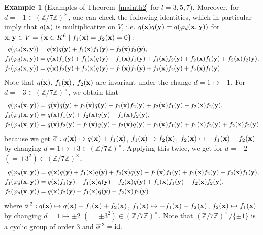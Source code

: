 \documentclass[a4paper, 11pt]{amsart}
\newcommand{\Z}{\mathbb Z}
\theoremstyle{plain}
\theoremstyle{definition}
\newtheorem{example}[thm]{Example}
\numberwithin{equation}{section}
\begin{document}
\begin{example}[Examples of Theorem~\ref{mainth2} for $l=3,5,7$]
Moreover, for $d=\pm 1\in (\Z/7\Z)^\times$, 
one can check the following identities, which in particular imply that $q({\bf x})$ is multiplicative on $V$, i.e. 
$q({\bf x})q({\bf y})=q(\varphi_d({\bf x}, {\bf y}))$ for 
${\bf x},{\bf y} \in V=\{{\bf x}\in K^6\mid f_1({\bf x})=f_2({\bf x})=0\}$:
\begin{align*}
q(\varphi_d({\bf x},{\bf y}))&=
q({\bf x})q({\bf y})+f_1({\bf x})f_1({\bf y})+f_2({\bf x})f_2({\bf y}),\\
f_1(\varphi_d({\bf x},{\bf y}))&=
q({\bf x})f_1({\bf y})+f_1({\bf x})q({\bf y})+f_1({\bf x})f_1({\bf y})+f_1({\bf x})f_2({\bf y})+f_2({\bf x})f_1({\bf y})+f_2({\bf x})f_2({\bf y}),\\
f_2(\varphi_d({\bf x},{\bf y}))&=
q({\bf x})f_2({\bf y})+f_2({\bf x})q({\bf y})+f_1({\bf x})f_1({\bf y})+f_1({\bf x})f_2({\bf y})+f_2({\bf x})f_1({\bf y}).
\end{align*}
Note that $q({\bf x})$, $f_1({\bf x})$, $f_2({\bf x})$ 
are invariant under the change $d=1\mapsto -1$. 
For $d=\pm 3\in (\Z/7\Z)^\times$, we obtain that
\begin{align*}
q(\varphi_d({\bf x},{\bf y}))&=
q({\bf x})q({\bf y})+f_1({\bf x})q({\bf y})-f_1({\bf x})f_2({\bf y})+f_2({\bf x})f_1({\bf y})-f_2({\bf x})f_2({\bf y}),\\
f_1(\varphi_d({\bf x},{\bf y}))&=
q({\bf x})f_1({\bf y})+f_2({\bf x})q({\bf y})-f_1({\bf x})f_2({\bf y}),\\
f_2(\varphi_d({\bf x},{\bf y}))&=
q({\bf x})f_2({\bf y})-f_1({\bf x})q({\bf y})-f_2({\bf x})q({\bf y})-f_1({\bf x})f_1({\bf y})+f_1({\bf x})f_2({\bf y})+f_2({\bf x})f_2({\bf y})
\end{align*}
because we get 
$\overline{\sigma}: q({\bf x})\mapsto q({\bf x})+f_1({\bf x})$, 
$f_1({\bf x})\mapsto f_2({\bf x})$, $f_2({\bf x})\mapsto -f_1({\bf x})-f_2({\bf x})$ by changing $d=1\mapsto \pm 3\in (\Z/7\Z)^\times$. 
Applying this twice, we get for $d=\pm 2$ $(=\pm 3^2)\in (\Z/7\Z)^\times$,
\begin{align*}
q(\varphi_d({\bf x},{\bf y}))&=
q({\bf x})q({\bf y})+f_1({\bf x})q({\bf y})+f_2({\bf x})q({\bf y})-f_1({\bf x})f_1({\bf y})+f_1({\bf x})f_2({\bf y})-f_2({\bf x})f_1({\bf y}),\\
f_1(\varphi_d({\bf x},{\bf y}))&=
q({\bf x})f_1({\bf y})-f_1({\bf x})q({\bf y})-f_2({\bf x})q({\bf y})+f_1({\bf x})f_1({\bf y})-f_2({\bf x})f_2({\bf y}),\\
f_2(\varphi_d({\bf x},{\bf y}))&=
q({\bf x})f_2({\bf y})+f_1({\bf x})q({\bf y})-f_2({\bf x})f_1({\bf y}) 
\end{align*}
where $\overline{\sigma}^{\,2}: 
q({\bf x})\mapsto q({\bf x})+f_1({\bf x})+f_2({\bf x})$, 
$f_1({\bf x})\mapsto -f_1({\bf x})-f_2({\bf x})$, 
$f_2({\bf x})\mapsto f_1({\bf x})$ by changing $d=1\mapsto \pm 2$ 
$(=\pm 3^2)\in (\Z/7\Z)^\times$. 
Note that $(\Z/7\Z)^\times/\{\pm 1\}$ is a cyclic group of order $3$ 
and $\overline{\sigma}^{\,3}={\rm id}$. 
\end{example}
\end{document}
